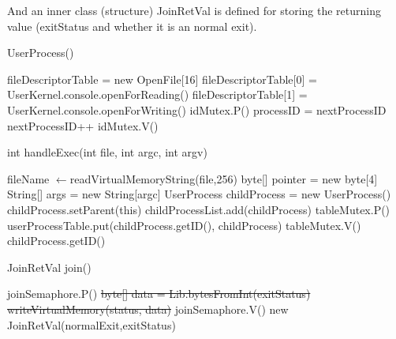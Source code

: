 \documentclass{article}
\renewcommand{\gets}{%
  \ensuremath{\leftarrow}}
\begin{document}
\begin{spacing}{1.1}
And an inner class (structure) \textsf{JoinRetVal} is defined for storing the returning value (exitStatus and whether it is an normal exit).
\begin{algorithm}
  \label{alg:UserProcess}
  \caption{\textsf{UserProcess}()}
  fileDescriptorTable = new OpenFile[16]\;
  fileDescriptorTable[0] = UserKernel.console.openForReading()\;
  fileDescriptorTable[1] = UserKernel.console.openForWriting()\;
  \colorbox{myyellow}{idMutex.P()}\;
  processID = nextProcessID\;
  nextProcessID++\;
  \colorbox{myyellow}{idMutex.V()}\;
\end{algorithm}

\begin{algorithm}[H]
  \label{alg:handleExec}
  \caption{int \textsf{handleExec}(int file, int argc, int argv)}
  fileName\gets\textsf{readVirtualMemoryString}(file,256)\;
   {
    \;
  }
  byte[] pointer = new byte[4]\;
  String[] args = new String[argc]\;
  UserProcess childProcess = new UserProcess()\;
   {
    \;
  }
  childProcess.setParent(this)\;
  childProcessList.add(childProcess)\;
  \colorbox{myyellow}{tableMutex.P()}\;
  userProcessTable.put(childProcess.getID(), childProcess)\;
  \colorbox{myyellow}{tableMutex.V()}\;
  \Return childProcess.getID()\;
\end{algorithm}

\begin{algorithm}
  \label{alg:join}
  \caption{JoinRetVal \textsf{join}()}
  joinSemaphore.P()\;
  {\color{red}\sout{byte[] data = Lib.bytesFromInt(exitStatus)}\;
  \sout{writeVirtualMemory(status, data)}\;}
  joinSemaphore.V()\;
  {\color{red}\Return new JoinRetVal(normalExit,exitStatus)\;}
\end{algorithm}


\end{spacing}
\end{document}
